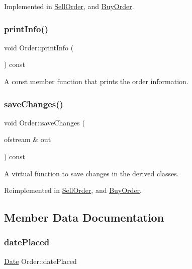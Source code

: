 Implemented in \hyperlink{class_sell_order_ae4e19807431bcd87c7126d0c644ff209}{Sell\+Order}, and \hyperlink{class_buy_order_a45641eed13ea191fff675745a618b9f5}{Buy\+Order}.

\mbox{\label{class_order_a718aea4e96286f2333222d6414eaa317}} 
\subsubsection{\texorpdfstring{print\+Info()}{printInfo()}}
{\footnotesize\ttfamily void Order\+::print\+Info (\begin{DoxyParamCaption}{ }\end{DoxyParamCaption}) const}

A const member function that prints the order information. \mbox{\label{class_order_a83989bde0a9b40cbeb0e87c965f6096e}} 
\subsubsection{\texorpdfstring{save\+Changes()}{saveChanges()}}
{\footnotesize\ttfamily void Order\+::save\+Changes (\begin{DoxyParamCaption}\item[{ofstream \&}]{out }\end{DoxyParamCaption}) const\hspace{0.3cm}{\ttfamily [virtual]}}

A virtual function to save changes in the derived classes. 

Reimplemented in \hyperlink{class_sell_order_a81c6ea39652c38a718803c036767787f}{Sell\+Order}, and \hyperlink{class_buy_order_aa4f087d0dbc1f6e8937c0b3679fc2f7b}{Buy\+Order}.



\subsection{Member Data Documentation}
\mbox{\label{class_order_a23f58bb3f0162aac8c91a8a14136990c}} 
\subsubsection{\texorpdfstring{date\+Placed}{datePlaced}}
{\footnotesize\ttfamily \hyperlink{class_date}{Date} Order\+::date\+Placed\hspace{0.3cm}{\ttfamily [protected]}}

